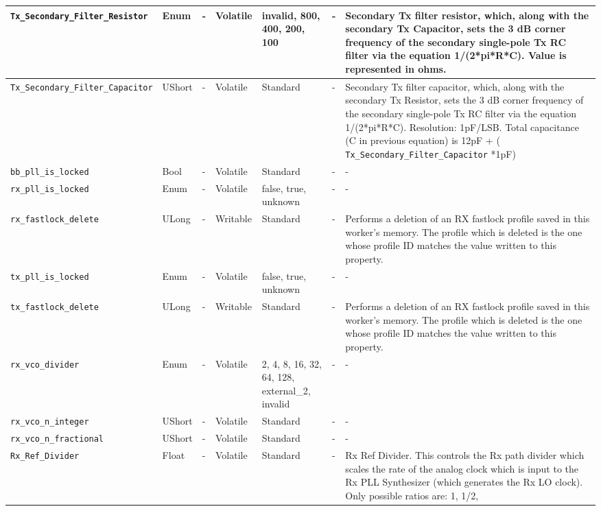 \documentclass{article}
\begin{document}
\begin{landscape}
\begin{scriptsize}
\begin{longtable}{|p{3.6cm}|p{8.1cm}|p{1.4cm}|p{1.3cm}|p{1.4cm}|p{2.5cm}|p{3.6cm}|}
			\hline
			\verb+Tx_Secondary_Filter_Resistor+ & Enum & - & Volatile & invalid, 800, 400, 200, 100 & - & Secondary Tx filter resistor, which, along with the secondary Tx Capacitor, sets the 3 dB corner frequency of the secondary single-pole Tx RC filter via the equation 1/(2*pi*R*C). Value is represented in ohms. \\
			\hline
			\verb+Tx_Secondary_Filter_Capacitor+ & UShort & - & Volatile & Standard & - & 
Secondary Tx filter capacitor, which, along with the secondary Tx Resistor, sets the 3 dB corner frequency of the secondary single-pole Tx RC filter via the equation 1/(2*pi*R*C). Resolution: 1pF/LSB. Total capacitance (C in previous equation) is 12pF + ( \verb+Tx_Secondary_Filter_Capacitor+ *1pF) \\
			\hline
			\verb+bb_pll_is_locked+ & Bool & - & Volatile & Standard & - & - \\
			\hline
			\verb+rx_pll_is_locked+ & Enum & - & Volatile & false, true, unknown & - & - \\
			\hline
			\verb+rx_fastlock_delete+ & ULong & - & Writable & Standard & - & Performs a deletion of an RX fastlock profile saved in this worker's memory. The profile which is deleted is the one whose profile ID matches the value written to this property. \\
			\hline
			\verb+tx_pll_is_locked+ & Enum & - & Volatile & false, true, unknown & - & - \\
			\hline
			\verb+tx_fastlock_delete+ & ULong & - & Writable & Standard & - & Performs a deletion of an RX fastlock profile saved in this worker's memory. The profile which is deleted is the one whose profile ID matches the value written to this property. \\
			\hline
			\verb+rx_vco_divider+ & Enum & - & Volatile & 2, 4, 8, 16, 32, 64, 128, external\_2, invalid & - & - \\
			\hline
			\verb+rx_vco_n_integer+ & UShort & - & Volatile & Standard & - & - \\
			\hline
			\verb+rx_vco_n_fractional+ & UShort & - & Volatile & Standard & - & - \\
			\hline
			\verb+Rx_Ref_Divider+ & Float & - & Volatile & Standard & - & 
                                  Rx Ref Divider. This controls the
                                    Rx path divider which scales the rate of the
                                    analog clock which is input to the Rx PLL
                                    Synthesizer (which generates the Rx LO
                                    clock). Only possible ratios are: 1, 1/2,

\end{longtable}
\end{scriptsize}
\end{landscape}
\end{document}
